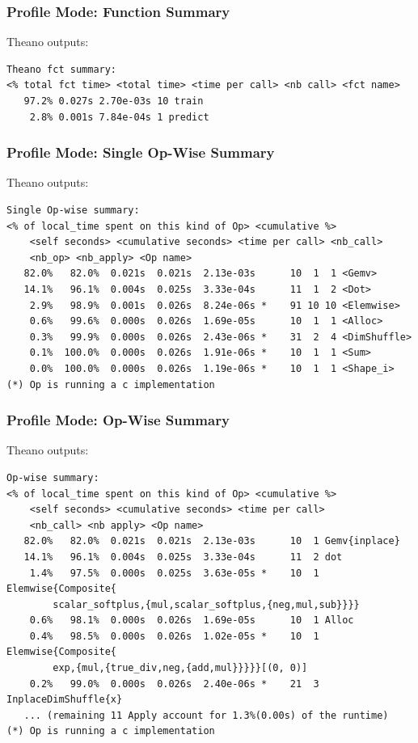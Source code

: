 \documentclass[a4paper,9pt]{beamer}
\begin{document}
\begin{frame}[fragile]
\frametitle{Profile Mode: Function Summary}
Theano outputs:
\vfill
\begin{Verbatim}
Theano fct summary:
<% total fct time> <total time> <time per call> <nb call> <fct name>
   97.2% 0.027s 2.70e-03s 10 train
    2.8% 0.001s 7.84e-04s 1 predict
\end{Verbatim}
\end{frame}

\begin{frame}[fragile]
\frametitle{Profile Mode: Single Op-Wise Summary}
Theano outputs:
\vfill
\begin{Verbatim}
Single Op-wise summary:
<% of local_time spent on this kind of Op> <cumulative %> 
    <self seconds> <cumulative seconds> <time per call> <nb_call>
    <nb_op> <nb_apply> <Op name>
   82.0%   82.0%  0.021s  0.021s  2.13e-03s      10  1  1 <Gemv>
   14.1%   96.1%  0.004s  0.025s  3.33e-04s      11  1  2 <Dot>
    2.9%   98.9%  0.001s  0.026s  8.24e-06s *    91 10 10 <Elemwise>
    0.6%   99.6%  0.000s  0.026s  1.69e-05s      10  1  1 <Alloc>
    0.3%   99.9%  0.000s  0.026s  2.43e-06s *    31  2  4 <DimShuffle>
    0.1%  100.0%  0.000s  0.026s  1.91e-06s *    10  1  1 <Sum>
    0.0%  100.0%  0.000s  0.026s  1.19e-06s *    10  1  1 <Shape_i>
(*) Op is running a c implementation
\end{Verbatim}
\end{frame}

\begin{frame}[fragile]
\frametitle{Profile Mode: Op-Wise Summary}
Theano outputs:
\vfill
\begin{Verbatim}
Op-wise summary:
<% of local_time spent on this kind of Op> <cumulative %>
    <self seconds> <cumulative seconds> <time per call>
    <nb_call> <nb apply> <Op name>
   82.0%   82.0%  0.021s  0.021s  2.13e-03s      10  1 Gemv{inplace}
   14.1%   96.1%  0.004s  0.025s  3.33e-04s      11  2 dot
    1.4%   97.5%  0.000s  0.025s  3.63e-05s *    10  1 Elemwise{Composite{
        scalar_softplus,{mul,scalar_softplus,{neg,mul,sub}}}}
    0.6%   98.1%  0.000s  0.026s  1.69e-05s      10  1 Alloc
    0.4%   98.5%  0.000s  0.026s  1.02e-05s *    10  1 Elemwise{Composite{
        exp,{mul,{true_div,neg,{add,mul}}}}}[(0, 0)]
    0.2%   99.0%  0.000s  0.026s  2.40e-06s *    21  3 InplaceDimShuffle{x}
   ... (remaining 11 Apply account for 1.3%(0.00s) of the runtime)
(*) Op is running a c implementation
\end{Verbatim}
\end{frame}
\end{document}
